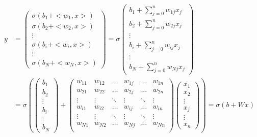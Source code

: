 \documentclass[12pt, french, twoside]{report}
\begin{document}
\begin{equation} \label{def_couche}
    \begin{split}
        y & =
        \left(\begin{matrix}
            \sigma(b_1 + <w_1, x>) \\
            \sigma(b_2 + <w_2, x>) \\
            \vdots \\
            \sigma(b_i + <w_i, x>) \\
            \vdots \\
            \sigma(b_N + <w_N, x>)
        \end{matrix}\right)
        =
        \sigma\left(\begin{matrix}
            b_1 + \sum_{j=0}^{n} w_{1j}x_j \\
            b_2 + \sum_{j=0}^{n} w_{2j}x_j \\
            \vdots \\
            b_i + \sum_{j=0}^{n} w_{ij}x_j \\
            \vdots \\
            b_N + \sum_{j=0}^{n} w_{Nj}x_j
        \end{matrix}\right)\\
        & = \sigma\left(
            \left(\begin{matrix}
                b_1 \\ b_2 \\ \vdots \\ b_i \\ \vdots \\ b_N
            \end{matrix}\right)
            +
            \left(\begin{matrix}
                w_{11} & w_{12} & \hdots & w_{1j} & \hdots & w_{1n} \\
                w_{21} & w_{22} & \hdots & w_{2j} & \hdots & w_{2n} \\
                \vdots & \vdots & \ddots & \vdots & \ddots & \vdots \\
                w_{i1} & w_{i2} & \hdots & w_{ij} & \hdots & w_{in} \\
                \vdots & \vdots & \ddots & \vdots & \ddots & \vdots \\
                w_{N1} & w_{N2} & \hdots & w_{Nj} & \hdots & w_{Nn} \\
            \end{matrix}\right)
            \left(\begin{matrix}
                x_1 \\ x_2 \\ \vdots \\ x_j \\ \vdots \\ x_n
            \end{matrix}\right)
        \right)
        = \sigma(b + Wx)
    \end{split}
\end{equation}
\end{document}
